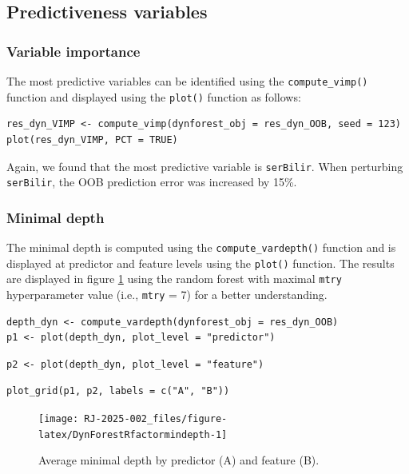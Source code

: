 \subsection{Predictiveness variables}\label{predictiveness-variables}

\subsubsection{Variable importance}\label{variable-importance-2}

The most predictive variables can be identified using the \texttt{compute\_vimp()} function and displayed using the \texttt{plot()} function as follows:

\begin{verbatim}
res_dyn_VIMP <- compute_vimp(dynforest_obj = res_dyn_OOB, seed = 123)
plot(res_dyn_VIMP, PCT = TRUE)
\end{verbatim}

Again, we found that the most predictive variable is \texttt{serBilir}. When perturbing \texttt{serBilir}, the OOB prediction error was increased by 15\%.

\subsubsection{Minimal depth}\label{minimal-depth-2}

The minimal depth is computed using the \texttt{compute\_vardepth()} function and is displayed at predictor and feature levels using the \texttt{plot()} function. The results are displayed in figure \ref{fig:DynForestRfactormindepth} using the random forest with maximal \texttt{mtry} hyperparameter value (i.e., \texttt{mtry} = 7) for a better understanding.

\begin{verbatim}
depth_dyn <- compute_vardepth(dynforest_obj = res_dyn_OOB)
p1 <- plot(depth_dyn, plot_level = "predictor")
\end{verbatim}

\begin{verbatim}
p2 <- plot(depth_dyn, plot_level = "feature")
\end{verbatim}

\begin{verbatim}
plot_grid(p1, p2, labels = c("A", "B"))
\end{verbatim}

\begin{figure}

{\centering \texttt{[image: RJ-2025-002\_files/figure-latex/DynForestRfactormindepth-1]} 

}

\caption{Average minimal depth by predictor (A) and feature (B).}\label{fig:DynForestRfactormindepth}
\end{figure}

